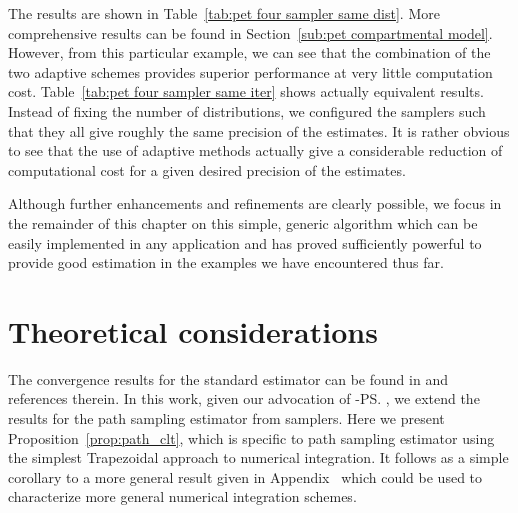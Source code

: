 

The results are shown in Table~\ref{tab:pet four sampler same dist}. More
comprehensive results can be found in Section~\ref{sub:pet compartmental
  model}. However, from this particular example, we can see that the
combination of the two adaptive schemes provides superior performance at very
little computation cost. Table~\ref{tab:pet four sampler same iter} shows
actually equivalent results. Instead of fixing the number of distributions, we
configured the samplers such that they all give roughly the same precision of
the estimates. It is rather obvious to see that the use of adaptive methods
actually give a considerable reduction of computational cost for a given
desired precision of the estimates.



Although further enhancements and refinements are clearly possible, we focus
in the remainder of this chapter on this simple, generic algorithm which can
be easily implemented in any application and has proved sufficiently powerful
to provide good estimation in the examples we have encountered thus far.

\section{Theoretical considerations}
\label{sec:Theoretical considerations}

The convergence results for the standard estimator can be found in
\cite{DelMoral:2006hc} and references therein. In this work, given our
advocation of \smc[2]-\ps, we extend the results for the path sampling
estimator from \smc samplers. Here we present Proposition~\ref{prop:path_clt},
which is specific to path sampling estimator using the simplest Trapezoidal
approach to numerical integration. It follows as a simple corollary to a more
general result given in Appendix~ which
could be used to characterize more general numerical integration schemes.

